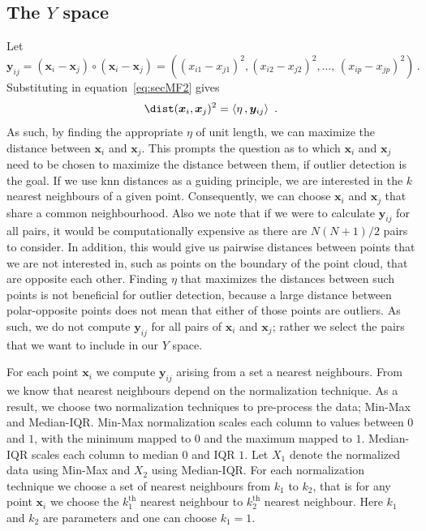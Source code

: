 \documentclass[a4paper,11pt]{article}
\begin{document}
\subsection{The $Y$ space}\label{sec:MathFrame1}
Let  $\bm{y}_{ij} = \left( \bm{x}_i - \bm{x}_j \right)\circ \left( \bm{x}_i - \bm{x}_j \right) = \left( \left( x_{i1} - x_{j1} \right)^2, \left( x_{i2} - x_{j2} \right)^2, \ldots,  \,  \left( x_{ip} - x_{jp} \right)^2  \right)\, . $ Substituting in equation~\eqref{eq:secMF2} gives
\begin{equation}\label{eq:secMF3}
    \dist(\bm{x}_i, \bm{x}_j)^2 = \left\langle \eta\, ,  \bm{y}_{ij} \right\rangle\, \, .
\end{equation}
As such, by finding the appropriate $\eta$ of unit length,  we can maximize the distance between $\bm{x}_i$ and $\bm{x}_j$.  This prompts the question as to which $\bm{x}_i$ and $\bm{x}_j$ need to be chosen to maximize the distance between them, if outlier detection is the goal. If we use knn distances as a guiding principle, we are interested in the $k$ nearest neighbours of a given point. Consequently, we can choose $\bm{x}_i$ and $\bm{x}_j$ that share a common neighbourhood. Also we note that if we were to calculate $\bm{y}_{ij}$ for all pairs, it would be computationally expensive as there are $N(N+1)/2$ pairs to consider. In addition, this would give us pairwise distances between points that we are not interested in, such as points on the boundary of the point cloud, that are opposite each other. Finding  $\eta$ that maximizes the distances between such points is not beneficial for outlier detection, because a large distance between polar-opposite points does not mean that either of those points are outliers. As such, we do not compute $\bm{y}_{ij}$ for all pairs of $\bm{x}_i$ and $\bm{x}_j$; rather we select the pairs that we want to include in our $Y$ space.

For each point $\bm{x}_i$ we compute $\bm{y}_{ij}$ arising from a set a nearest neighbours. From \cite{kandanaarachchi2018normalization} we know that nearest neighbours depend on the normalization technique. As a result, we choose two normalization techniques to pre-process the data; Min-Max and Median-IQR. Min-Max normalization scales each column to values between $0$ and $1$, with the minimum mapped to $0$ and the maximum mapped to $1$.  Median-IQR scales each column to median $0$ and IQR $1$. Let $X_1$ denote the normalized data using  Min-Max and $X_2$ using Median-IQR. For each normalization technique we choose a set of nearest neighbours from $k_1$ to $k_2$, that is for any point $\bm{x}_i$ we choose the $k_1^{\text{th}}$ nearest neighbour to  $k_2^{\text{th}}$ nearest neighbour. Here $k_1$ and $k_2$ are parameters and one can choose $k_1 =1$.
\end{document}
